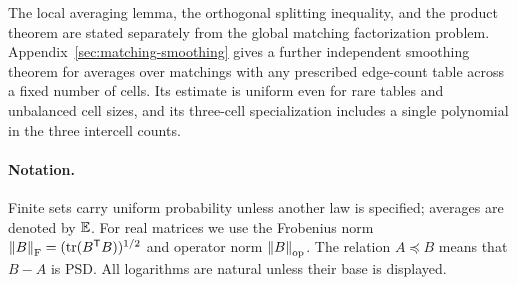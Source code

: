 The local averaging lemma, the orthogonal splitting inequality,
and the product theorem are stated separately from the global
matching factorization problem.
Appendix~\ref{sec:matching-smoothing} gives a further independent
smoothing theorem for averages over matchings with any prescribed
edge-count table across a fixed number of cells.  Its estimate is
uniform even for rare tables and unbalanced cell sizes, and its
three-cell specialization includes a single polynomial in the
three intercell counts.

\paragraph{Notation.}
Finite sets carry uniform probability unless another law is specified;
averages are denoted by $\mathbb E$.  For real matrices we use the Frobenius
norm $\left\lVert B\right\rVert_{\mathrm F}=(\operatorname{tr}(B^{\mathsf T}B))^{1/2}$ and operator norm
$\left\lVert B\right\rVert_{\mathrm{op}}$.  The relation $A\preceq B$ means that $B-A$ is PSD.
All logarithms are natural unless their base is displayed.
